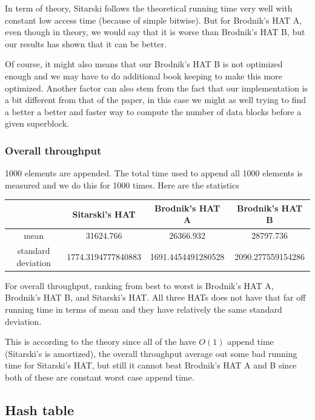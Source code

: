 \documentclass{article} %
\begin{document}
    In term of theory, Sitarski follows the theoretical running time very well with constant low access time (because of simple bitwise).
    But for Brodnik's HAT A, even though in theory, we would say that it is worse than Brodnik's HAT B, but our results has shown that it can be better.

    Of course, it might also means that our Brodnik's HAT B is not optimized enough and we may have to do additional book keeping to make this more optimized.
    Another factor can also stem from the fact that our implementation is a bit different from that of the paper, in this case we might as well trying to find a better
    a better and faster way to compute the number of data blocks before a given superblock.

    \subsubsection*{Overall throughput}
    1000 elements are appended. The total time used to append all 1000 elements is measured and we do this for 1000 times.
    Here are the statistics
    \begin{center}
        \begin{tabular}{|c|c|c|c|}\hline
            & Sitarski's HAT & Brodnik's HAT A & Brodnik's HAT B\\\hline
            mean &  31624.766 & 26366.932 & 28797.736\\\hline
            standard deviation & 1774.3194777840883  & 1691.4454491280528 & 2090.277559154286\\\hline 
        \end{tabular}
    \end{center}
    For overall throughput, ranking from best to worst is Brodnik's HAT A, Brodnik's HAT B, and Sitarski's HAT.
    All three HATs does not have that far off running time in terms of mean and they have relatively the same standard deviation.

    This is according to the theory since all of the have $O(1)$ append time (Sitarski's is amortized), the overall throughput
    average out some bad running time for Sitarski's HAT, but still it cannot beat Brodnik's HAT A and B since both of these are constant worst case append time.
    
    \subsection*{Hash table}
\end{document}
